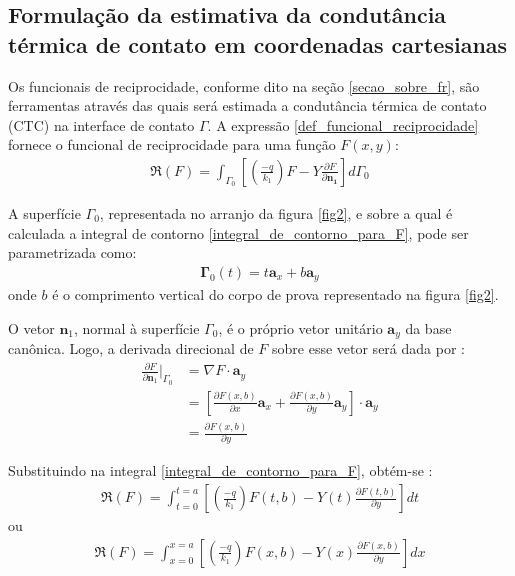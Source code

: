 \subsection{Formulação da estimativa da condutância térmica de contato em coordenadas cartesianas}

Os funcionais de reciprocidade, conforme dito na seção \ref{secao_sobre_fr}, são ferramentas através das quais será estimada a condutância térmica de contato (CTC) na interface de contato $\Gamma$. A expressão \eqref{def_funcional_reciprocidade} fornece o funcional de reciprocidade para uma função $F(x, y)$:
\begin{align}
\Re(F)
=
\int_{\Gamma_0}\left[\left(\frac{-q}{k_1}\right)F - Y\frac{\partial F}{\partial\mathbf{n_1}}\right]d\Gamma_0
\label{integral_de_contorno_para_F}
\end{align}

A superfície $\Gamma_0$, representada no arranjo da figura \ref{fig2}, e sobre a qual é calculada a integral de contorno \eqref{integral_de_contorno_para_F}, pode ser parametrizada como:
\begin{align}
\mathbf{\Gamma}_0(t) = t\mathbf{a}_x + b \mathbf{a}_y
\end{align}
onde $b$ é o comprimento vertical do corpo de prova representado na figura \ref{fig2}.

O vetor $\mathbf{n}_1$, normal à superfície $\Gamma_0$, é o próprio vetor unitário $\mathbf{a}_y$ da base canônica. Logo, a derivada direcional de $F$ sobre esse vetor será dada por \citep{livro_stewart}:
\begin{align}
\frac{\partial F}{\partial\mathbf{n}_1}\bigg|_{\Gamma_0} & = \nabla F \cdot \mathbf{a}_y \nonumber \\
& = \left[\frac{\partial F(x, b)}{\partial x}\mathbf{a}_x + \frac{\partial F(x, b)}{\partial y}\mathbf{a}_y \right] \cdot \mathbf{a}_y \nonumber \\
& = \frac{\partial F(x, b)}{\partial y}
\end{align} 

Substituindo na integral \eqref{integral_de_contorno_para_F}, obtém-se \citep{livro_stewart}:
\begin{align}
\Re(F)
=
\int_{t=0}^{t=a} \left[\left(\frac{-q}{k_1}\right)F(t, b) - Y(t)\frac{\partial F(t, b)}{\partial y}\right] dt
\label{integral_de_contorno_para_F_2}
\end{align}
ou
\begin{align}
\Re(F)
=
\int_{x=0}^{x=a} \left[\left(\frac{-q}{k_1}\right)F(x, b) - Y(x)\frac{\partial F(x, b)}{\partial y}\right] dx
\label{integral_de_contorno_para_F_3}
\end{align}

